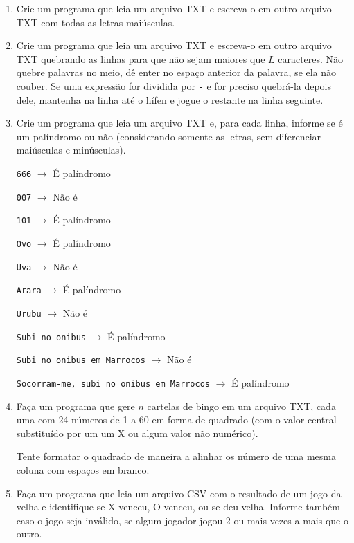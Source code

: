 \begin{enumerate}
	\item Crie um programa que leia um arquivo TXT e escreva-o em outro arquivo TXT com todas as letras maiúsculas.
	
	\item Crie um programa que leia um arquivo TXT e escreva-o em outro arquivo TXT quebrando as linhas para que não sejam maiores que $L$ caracteres.
	Não quebre palavras no meio, dê enter no espaço anterior da palavra, se ela não couber.
	Se uma expressão for dividida por \texttt{-} e for preciso quebrá-la depois dele, mantenha na linha até o hífen e jogue o restante na linha seguinte.
	
	\item Crie um programa que leia um arquivo TXT e, para cada linha, informe se é um palíndromo ou não (considerando somente as letras, sem diferenciar maiúsculas e minúsculas).
	
	\texttt{666} $\rightarrow$ É palíndromo
	
	\texttt{007} $\rightarrow$ Não é
	
	\texttt{101} $\rightarrow$ É palíndromo
	
	\texttt{Ovo} $\rightarrow$ É palíndromo 
	
	\texttt{Uva} $\rightarrow$ Não é
	
	\texttt{Arara} $\rightarrow$ É palíndromo 
	
	\texttt{Urubu} $\rightarrow$ Não é
	
	\texttt{Subi no onibus} $\rightarrow$ É palíndromo 
	
	\texttt{Subi no onibus em Marrocos} $\rightarrow$ Não é
	
	\texttt{Socorram-me, subi no onibus em Marrocos} $\rightarrow$ É palíndromo
	
	\item Faça um programa que gere $n$ cartelas de bingo em um arquivo TXT, cada uma com 24 números de 1 a 60 em forma de quadrado (com o valor central substituído por um um X ou algum valor não numérico).
	
	Tente formatar o quadrado de maneira a alinhar os número de uma mesma coluna com espaços em branco.		


	
	\item Faça um programa que leia um arquivo CSV com o resultado de um jogo da velha e identifique se X venceu, O venceu, ou se deu velha.
	Informe também caso o jogo seja inválido, se algum jogador jogou 2 ou mais vezes a mais que o outro. 
	

\end{enumerate}
